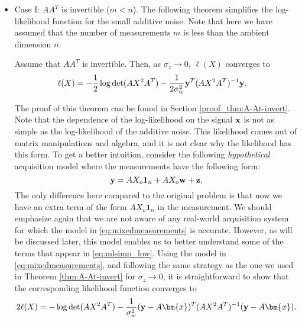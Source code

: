\documentclass[onecolumn]{IEEEtran}
\newcommand{\wv}{{\bf w}}
\begin{document}
\begin{itemize}
\item {Case I: $AA^T$ is invertible ($m<n$).}\label{sec:case1-ML}
The following theorem simplifies the log-likelihood function for the small additive noise. Note that here we have assumed that the number of measurements $m$ is less than the ambient dimension $n$. 

 \begin{theorem}\label{thm:A-At-invert}
Assume that $AA^T$ is invertible. Then, as $\sigma_z\to 0$, $\ell(X)$ converges to
\begin{align}\label{eq:mlsimp_low}
\ell(X)&=-{1\over 2}\log\det(AX^2A^T)-{1\over 2\sigma_w^2}{\bf y}^T(AX^2A^T)^{-1}{\bf y}.
\end{align}
\end{theorem}

The proof of this theorem can be found in Section \ref{proof_thm:A-At-invert}. Note that the dependence of the log-likelihood on the signal ${\bf x}$ is not as simple as the log-likelihood of the additive noise. This likelihood comes out of matrix manipulations and algebra, and it is not clear why the likelihood has this form.  To get a better intuition,  consider the following {\em hypothetical} acquisition model where the measurements have the following form:
\begin{equation}\label{eq:mixedmeasurements}
\yv= AX_o \mathbf{1}_n + AX_o\wv+\zv,
\end{equation}
The only difference here compared to the original problem is that now we have an extra term of the form $AX_o \mathbf{1}_n$ in the measurement. We should emphasize again that we are not aware of any real-world acquisition system for which the model in \eqref{eq:mixedmeasurements} is accurate. However, as will be discussed later, this model enables us to better understand some of the terms that appear in \eqref{eq:mlsimp_low}. Using the model in \eqref{eq:mixedmeasurements}, and following the same strategy as the one we used in Theorem \ref{thm:A-At-invert} for $\sigma_z \rightarrow 0$, it is straightforward to show that the corresponding likelihood function converges to 
\begin{align}
2\ell (X) = -\log\det(AX^2 A^T) - \frac{1}{\sigma_w^2} (\yv-A \bm{x})^T (AX^2A^T)^{-1} (\yv-A\bm{x}). \label{eq:likelihood-with-bias}
\end{align}


\end{itemize}
\end{document}
